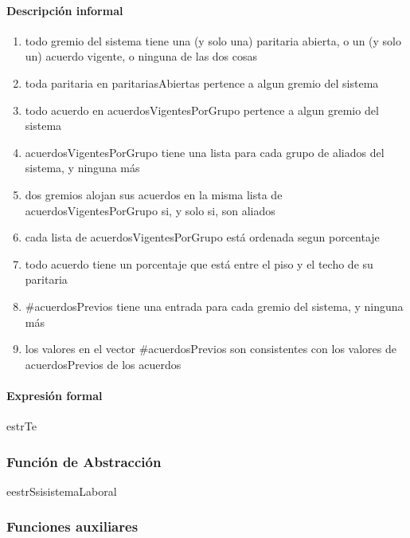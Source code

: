 \paragraph{Descripción informal}
\begin{enumerate}

	\item todo gremio del sistema tiene una (y solo una) paritaria abierta, o un (y solo un) acuerdo vigente, o ninguna de las dos cosas
	\item toda paritaria en paritariasAbiertas pertence a algun gremio del sistema
	\item todo acuerdo en acuerdosVigentesPorGrupo pertence a algun gremio del sistema
	\item acuerdosVigentesPorGrupo tiene una lista para cada grupo de aliados del sistema, y ninguna más
	\item dos gremios alojan sus acuerdos en la misma lista de acuerdosVigentesPorGrupo si, y solo si, son aliados
	\item cada lista de acuerdosVigentesPorGrupo está ordenada segun porcentaje
	\item todo acuerdo tiene un porcentaje que está entre el piso y el techo de su paritaria
	\item \#acuerdosPrevios tiene una entrada para cada gremio del sistema, y ninguna más
	\item los valores en el vector \#acuerdosPrevios son consistentes con los valores de acuerdosPrevios de los acuerdos

\end{enumerate}

\paragraph{Expresión formal}
\begin{RepFormal}{estrT}{e}
\end{RepFormal}

\subsubsection{Funci\'on de Abstracci\'on}

\begin{FunAbsDescriptiva}{e}{estrS}{si}{sistemaLaboral}


\end{FunAbsDescriptiva}

\subsubsection{Funciones auxiliares}
